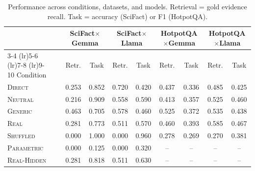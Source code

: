\begin{table}[t]
\centering
\caption{Performance across conditions, datasets, and models. Retrieval = gold evidence recall. Task = accuracy (SciFact) or F1 (HotpotQA).}
\label{tab:conditions}
\small
\begin{tabular}{llcccccccc}
\toprule
& & \multicolumn{2}{c}{SciFact$\times$Gemma} & \multicolumn{2}{c}{SciFact$\times$Llama} & \multicolumn{2}{c}{HotpotQA$\times$Gemma} & \multicolumn{2}{c}{HotpotQA$\times$Llama} \\
\cmidrule(lr){3-4} \cmidrule(lr){5-6} \cmidrule(lr){7-8} \cmidrule(lr){9-10}
Condition & & Retr. & Task & Retr. & Task & Retr. & Task & Retr. & Task \\
\midrule
\textsc{Direct} & & 0.253 & 0.852 & 0.720 & 0.420 & 0.437 & 0.336 & 0.485 & 0.425 \\
\textsc{Neutral} & & 0.216 & 0.909 & 0.558 & 0.590 & 0.413 & 0.357 & 0.525 & 0.460 \\
\textsc{Generic} & & 0.463 & 0.705 & 0.578 & 0.460 & 0.525 & 0.372 & 0.535 & 0.438 \\
\textsc{Real} & & 0.281 & 0.773 & 0.511 & 0.570 & 0.460 & 0.393 & 0.585 & 0.467 \\
\textsc{Shuffled} & & 0.000 & 1.000 & 0.000 & 0.960 & 0.278 & 0.269 & 0.270 & 0.381 \\
\textsc{Parametric} & & 0.000 & 0.125 & 0.000 & 0.320 & -- & -- & -- & -- \\
\textsc{Real-Hidden} & & 0.281 & 0.818 & 0.511 & 0.630 & -- & -- & -- & -- \\
\bottomrule
\end{tabular}
\end{table}